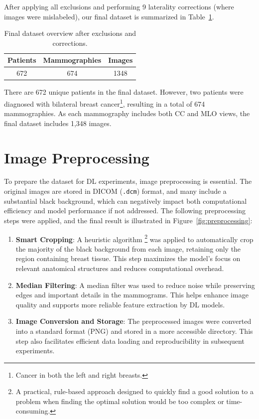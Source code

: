 \documentclass[a4paper,10pt]{book}
\begin{document}
After applying all exclusions and performing 9 laterality corrections (where images were mislabeled), our final dataset is summarized in Table~\ref{tab:final_dataset_overview}.

\begin{table}[h!]
    \caption[Final Dataset Overview]{Final dataset overview after exclusions and corrections.}
    \centering
    \begin{tabular}{c c c}
    \toprule
    \textbf{Patients} & \textbf{Mammographies} & \textbf{Images} \\
    \midrule
    672 & 674 & 1348 \\
    \bottomrule
    \end{tabular}
    \label{tab:final_dataset_overview}
\end{table}

There are 672 unique patients in the final dataset. However, two patients were diagnosed with bilateral breast cancer\footnote{Cancer in both the left and right breasts.}, resulting in a total of 674 mammographies. As each mammography includes both CC and MLO views, the final dataset includes 1,348 images.


\section{Image Preprocessing}

To prepare the dataset for DL experiments, image preprocessing is essential. The original images are stored in DICOM (\texttt{.dcm}) format, and many include a substantial black background, which can negatively impact both computational efficiency and model performance if not addressed. The following preprocessing steps were applied, and the final result is illustrated in Figure~\ref{fig:preprocessing}:


\begin{enumerate}
    \item \textbf{Smart Cropping}: A heuristic algorithm \footnote{A practical, rule-based approach designed to quickly find a good solution to a problem when finding the optimal solution would be too complex or time-consuming.} was applied to automatically crop the majority of the black background from each image, retaining only the region containing breast tissue. This step maximizes the model's focus on relevant anatomical structures and reduces computational overhead.
    \item \textbf{Median Filtering}: A median filter was used to reduce noise while preserving edges and important details in the mammograms. This helps enhance image quality and supports more reliable feature extraction by DL models.
    \item \textbf{Image Conversion and Storage}: The preprocessed images were converted into a standard format (PNG) and stored in a more accessible directory. This step also facilitates efficient data loading and reproducibility in subsequent experiments.
\end{enumerate}
\end{document}
